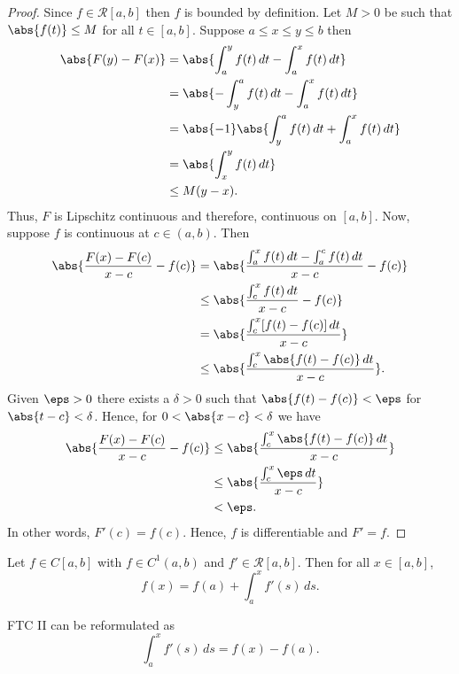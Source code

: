 \documentclass[12pt, a4paper]{article}
\begin{document}
\begin{proof}
    Since \(f \in \mathcal{R}[a,b]\) then \(f\) is bounded by definition. Let \(M >0\) be such that \(\abs{f(t)} \leq M\) for all \(t \in [a,b]\). Suppose \(a\leq x \leq y \leq b\) then 
    \[\begin{aligned}
        \abs{F(y)-F(x)} &=\abs{\int_a^y f(t) \, dt - \int_a^x f(t)\, dt} \\
        &=\abs{-\int_y^a f(t) \, dt - \int_a^x f(t)\, dt} \\
        &=\abs{-1}\abs{\int_y^a f(t) \, dt + \int_a^x f(t)\, dt} \\
        &= \abs{\int_x^y f(t) \, dt} \\
        &\leq M(y-x).
    \end{aligned}\]
    Thus, \(F\) is Lipschitz continuous and therefore, continuous on \([a,b]\). Now, suppose \(f\) is continuous at \(c\in (a,b)\). Then 
    \[\begin{aligned}
        \abs{\frac{F(x)-F(c)}{x-c}-f(c)} &= \abs{\frac{\int_a^x f(t)\, dt - \int_a^c f(t)\, dt}{x-c}-f(c)} \\
        &\leq \abs{\frac{\int_c^x f(t)\, dt}{x-c}-f(c)} \\
        &=\abs{\frac{\int_c^x [f(t)-f(c)]\, dt}{x-c}} \\
        &\leq \abs{\frac{\int_c^x \abs{f(t)-f(c)} \, dt}{x-c}}.
    \end{aligned}\]
    Given \(\eps>0\) there exists a \(\delta>0\) such that \(\abs{f(t)-f(c)}<\eps\) for \(\abs{t-c} <\delta\). Hence, for \(0<\abs{x-c}<\delta\) we have 
    \[\begin{aligned}
        \abs{\frac{F(x)-F(c)}{x-c}-f(c)} &\leq \abs{\frac{\int_c^x \abs{f(t)-f(c)} \, dt}{x-c}} \\
        &\leq \abs{\frac{\int_c^x \eps \, dt}{x-c}}\\
        &< \eps.
    \end{aligned}\]
    In other words, \(F'(c)=f(c)\). Hence, \(f\) is differentiable and \(F'=f\).
\end{proof}

\begin{mdthm}
    Let \(f\in C[a,b]\) with \(f\in C^1(a,b)\) and \(f'\in \mathcal{R}[a,b]\). Then for all \(x\in [a,b]\),
    \[f(x)=f(a)+\int_a^x f'(s) \, ds.\]
\end{mdthm}

\begin{mdnote}
    FTC II can be reformulated as
    \[\int_a^x f'(s) \, ds =f(x)-f(a).\]
\end{mdnote}
\end{document}
